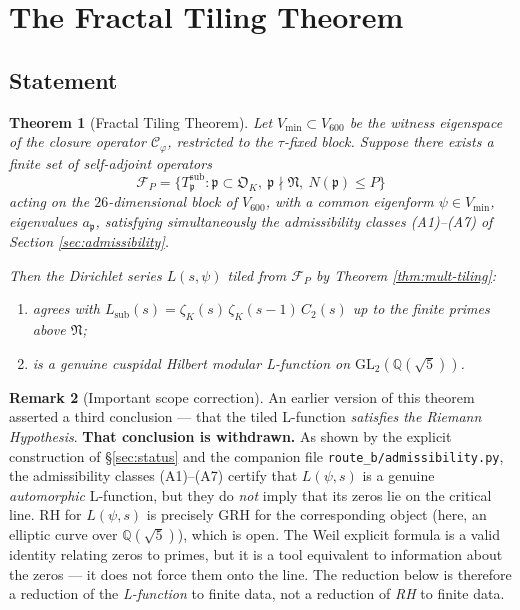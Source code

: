\documentclass[11pt,a4paper]{article}
\newtheorem{theorem}{Theorem}[section]
\theoremstyle{definition}
\newtheorem{remark}[theorem]{Remark}
\newcommand{\Q}{\mathbb{Q}}
\newcommand{\sub}{\mathrm{sub}}
\newcommand{\Vmin}{V_{\min}}
\newcommand{\Cphi}{\mathcal{C}_{\!\varphi}}
\begin{document}
\section{The Fractal Tiling Theorem}

\subsection{Statement}
\begin{theorem}[Fractal Tiling Theorem]\label{thm:fractal-tiling}
Let $\Vmin\subset V_{600}$ be the witness eigenspace of the closure operator
$\Cphi$, restricted to the $\tau$-fixed block. Suppose there exists a finite
set of self-adjoint operators
$$
\mathcal{F}_P = \{T_\mathfrak{p}^{\mathrm{sub}} : \mathfrak{p}\subset\mathfrak{O}_K,\ \mathfrak{p}\nmid\mathfrak{N},\ N(\mathfrak{p})\le P\}
$$
acting on the $26$-dimensional block of $V_{600}$, with a common eigenform
$\psi\in\Vmin$, eigenvalues $a_\mathfrak{p}$, satisfying simultaneously the
admissibility classes (A1)--(A7) of Section \ref{sec:admissibility}.

Then the Dirichlet series $L(s,\psi)$ tiled from $\mathcal{F}_P$ by Theorem
\ref{thm:mult-tiling}:
\begin{enumerate}
\item agrees with $L_\sub(s) = \zeta_K(s)\,\zeta_K(s-1)\,C_2(s)$ up to the
      finite primes above $\mathfrak{N}$;
\item is a genuine cuspidal Hilbert modular L-function on
      $\mathrm{GL}_2(\Q(\sqrt{5}))$.
\end{enumerate}
\end{theorem}

\begin{remark}[Important scope correction]\label{rem:no-rh}
An earlier version of this theorem asserted a third conclusion --- that the
tiled L-function \emph{satisfies the Riemann Hypothesis}. \textbf{That
conclusion is withdrawn.} As shown by the explicit construction of
\S\ref{sec:status} and the companion file \texttt{route\_b/admissibility.py},
the admissibility classes (A1)--(A7) certify that $L(\psi,s)$ is a genuine
\emph{automorphic} L-function, but they do \emph{not} imply that its zeros lie
on the critical line. RH for $L(\psi,s)$ is precisely GRH for the corresponding
object (here, an elliptic curve over $\Q(\sqrt5)$), which is open. The Weil
explicit formula is a valid identity relating zeros to primes, but it is a tool
equivalent to information about the zeros --- it does not force them onto the
line. The reduction below is therefore a reduction of the \emph{L-function}
to finite data, not a reduction of \emph{RH} to finite data.
\end{remark}
\end{document}
